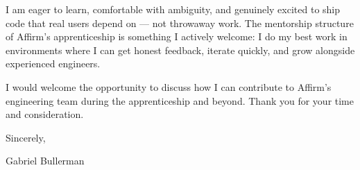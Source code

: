 \documentclass[letterpaper,11pt]{article}
\begin{document}
I am eager to learn, comfortable with ambiguity, and genuinely excited to ship code that real users depend on --- not throwaway work. The mentorship structure of Affirm's apprenticeship is something I actively welcome: I do my best work in environments where I can get honest feedback, iterate quickly, and grow alongside experienced engineers.

I would welcome the opportunity to discuss how I can contribute to Affirm's engineering team during the apprenticeship and beyond. Thank you for your time and consideration.

\vspace{12pt}

Sincerely,

\vspace{24pt}

Gabriel Bullerman
\end{document}
